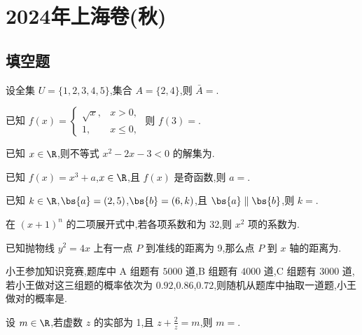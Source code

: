 \chapter{2024年上海卷(秋)}

\section{填空题}

\begin{problem}
设全集 \(U=\{1,2,3,4,5\}\),集合 \(A=\{2,4\}\),则 \(\bar{A}=\)\fillinblank{}.
\end{problem}

\begin{problem}
已知 \(f(x)=\begin{cases}
\sqrt{x}, & x>0,\\
1, & x\le 0,
\end{cases}\) 则 \(f(3)=\)\fillinblank{}.
\end{problem}

\begin{problem}
已知 \(x\in \R\),则不等式 \(x^2-2x-3<0\) 的解集为\fillinblank{}.
\end{problem}

\begin{problem}
已知 \(f(x)=x^3+a\),\(x\in \R\),且 \(f(x)\) 是奇函数,则 \(a=\)\fillinblank{}.
\end{problem}

\begin{problem}
已知 \(k\in \R\),\(\bs{a}=(2,5)\),\(\bs{b}=(6,k)\),且 \(\bs{a}\parallel\bs{b}\),则 \(k=\)\fillinblank{}.
\end{problem}

\begin{problem}
在 \((x+1)^n\) 的二项展开式中,若各项系数和为 32,则 \(x^2\) 项的系数为\fillinblank{}.
\end{problem}

\begin{problem}
已知抛物线 \(y^2=4x\) 上有一点 \(P\) 到准线的距离为 9,那么点 \(P\) 到 \(x\) 轴的距离为\fillinblank{}.
\end{problem}

\begin{problem}
小王参加知识竞赛,题库中 A 组题有 \(5000\) 道,B 组题有 \(4000\) 道,C 组题有 \(3000\) 道,若小王做对这三组题的概率依次为 \(0.92\),\(0.86\),\(0.72\),则随机从题库中抽取一道题,小王做对的概率是\fillinblank{}.
\end{problem}

\begin{problem}
设 \(m\in \R\),若虚数 \(z\) 的实部为 1,且 \(z+\frac{2}{z}=m\),则 \(m=\)\fillinblank{}.
\end{problem}

